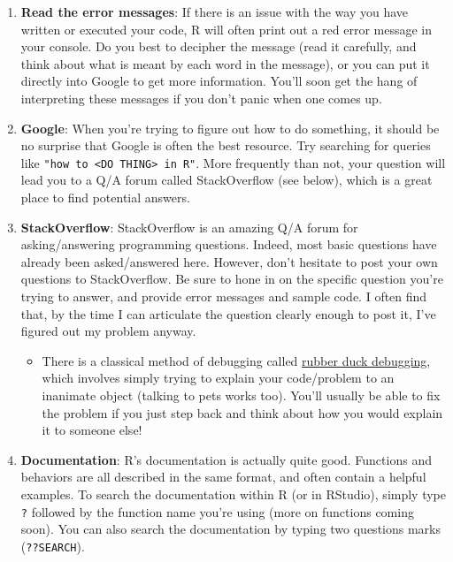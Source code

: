 \documentclass[]{book}
\providecommand{\tightlist}{%
  \setlength{\itemsep}{0pt}\setlength{\parskip}{0pt}}
\theoremstyle{definition}
\theoremstyle{definition}
\theoremstyle{remark}
\begin{document}
\begin{enumerate}
\def\labelenumi{\arabic{enumi}.}
\item
  \textbf{Read the error messages}: If there is an issue with the way
  you have written or executed your code, R will often print out a red
  error message in your console. Do you best to decipher the message
  (read it carefully, and think about what is meant by each word in the
  message), or you can put it directly into Google to get more
  information. You'll soon get the hang of interpreting these messages
  if you don't panic when one comes up.
\item
  \textbf{Google}: When you're trying to figure out how to do something,
  it should be no surprise that Google is often the best resource. Try
  searching for queries like
  \texttt{"how\ to\ \textless{}DO\ THING\textgreater{}\ in\ R"}. More
  frequently than not, your question will lead you to a Q/A forum called
  StackOverflow (see below), which is a great place to find potential
  answers.
\item
  \textbf{StackOverflow}: StackOverflow is an amazing Q/A forum for
  asking/answering programming questions. Indeed, most basic questions
  have already been asked/answered here. However, don't hesitate to post
  your own questions to StackOverflow. Be sure to hone in on the
  specific question you're trying to answer, and provide error messages
  and sample code. I often find that, by the time I can articulate the
  question clearly enough to post it, I've figured out my problem
  anyway.

  \begin{itemize}
  \tightlist
  \item
    There is a classical method of debugging called
    \href{https://en.wikipedia.org/wiki/Rubber_duck_debugging}{rubber
    duck debugging}, which involves simply trying to explain your
    code/problem to an inanimate object (talking to pets works too).
    You'll usually be able to fix the problem if you just step back and
    think about how you would explain it to someone else!
  \end{itemize}
\item
  \textbf{Documentation}: R's documentation is actually quite good.
  Functions and behaviors are all described in the same format, and
  often contain a helpful examples. To search the documentation within R
  (or in RStudio), simply type \texttt{?} followed by the function name
  you're using (more on functions coming soon). You can also search the
  documentation by typing two questions marks (\texttt{??SEARCH}).


\end{enumerate}
\end{document}
